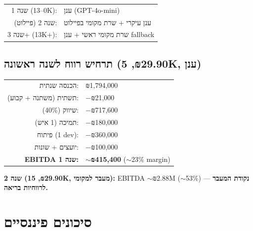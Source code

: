 \documentclass[11pt]{article}
\newcommand{\en}[1]{\textenglish{#1}}
\begin{document}
\begin{center}
\begin{tabular}{rl}
שנה 1 (\en{0--13K}): & ענן (\en{GPT-4o-mini}) \\
שנה 2 (פיילוט): & ענן עיקרי + שרת מקומי בפיילוט \\
שנה 3+ (\en{13K+}): & שרת מקומי ראשי + ענן \en{fallback} \\
\end{tabular}
\end{center}

\subsection*{תרחיש רווח לשנה ראשונה (₪\en{29.90}, \en{5K}, ענן)}

\begin{center}
\begin{tabular}{rl}
הכנסה שנתית: & ₪\en{1,794,000} \\
תשתית (משתנה + קבוע): & $-$₪\en{21,000} \\
שיווק (\en{40\%}): & $-$₪\en{717,600} \\
תמיכה (\en{1} איש): & $-$₪\en{180,000} \\
פיתוח (\en{1 dev}): & $-$₪\en{360,000} \\
יועצים + שונות: & $-$₪\en{100,000} \\
\hline
\textbf{\en{EBITDA} שנה 1:} & \textbf{$\sim$₪\en{415,400}} ($\sim$\en{23\%} \en{margin}) \\
\end{tabular}
\end{center}

\textbf{שנה 2 (₪\en{29.90}, \en{15K}, מעבר למקומי):} \en{EBITDA} $\sim$₪\en{2.88M} ($\sim$\en{53\%}) — \textbf{נקודת המעבר לרווחיות בריאה.}

\section{סיכונים פיננסיים}
\end{document}
